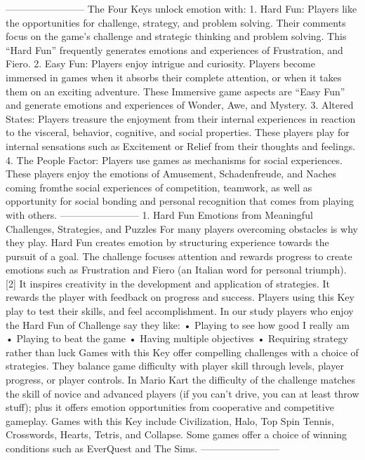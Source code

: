 ------------------------
The Four Keys unlock emotion with:
1. Hard Fun: Players like the opportunities for challenge, strategy, and problem solving. Their comments focus on the game's challenge and strategic thinking and problem solving. This ``Hard Fun'' frequently generates emotions and experiences of Frustration, and Fiero.
2. Easy Fun: Players enjoy intrigue and curiosity. Players become immersed in games when it absorbs their complete attention, or when it takes them on an exciting adventure. These Immersive game aspects are ``Easy Fun'' and generate emotions and experiences of Wonder, Awe, and Mystery.
3. Altered States: Players treasure the enjoyment from their internal experiences in reaction to the visceral, behavior, cognitive, and social properties. These players play for internal sensations such as Excitement or Relief from their thoughts and feelings.
4. The People Factor: Players use games as mechanisms for social experiences. These players enjoy the emotions of Amusement, Schadenfreude, and Naches coming fromthe social experiences of competition, teamwork, as well as opportunity for social bonding and personal recognition that comes from playing with others.
------------------------
1. Hard Fun
Emotions from Meaningful Challenges, Strategies, and Puzzles For many players overcoming obstacles is why they play. Hard Fun creates emotion by structuring experience towards the pursuit of a goal. The challenge focuses attention and rewards progress to create emotions such as Frustration and Fiero (an Italian word for personal triumph). [2] It inspires creativity in the development and application of strategies. It rewards the player with feedback on progress and success. Players using this Key play to test their skills, and feel accomplishment. In our study players who enjoy the Hard Fun of Challenge say they like:
• Playing to see how good I really am
• Playing to beat the game
• Having multiple objectives
• Requiring strategy rather than luck
Games with this Key offer compelling challenges with a choice of strategies. They balance game difficulty with player skill through levels, player progress, or player controls. In Mario Kart the difficulty of the challenge matches the skill of novice and advanced players (if you can't drive, you can at least throw stuff); plus it offers emotion opportunities from cooperative and competitive gameplay. Games with this Key include Civilization, Halo, Top Spin Tennis, Crosswords, Hearts, Tetris, and Collapse. Some games offer a choice of winning conditions such as EverQuest and The Sims.
------------------------
